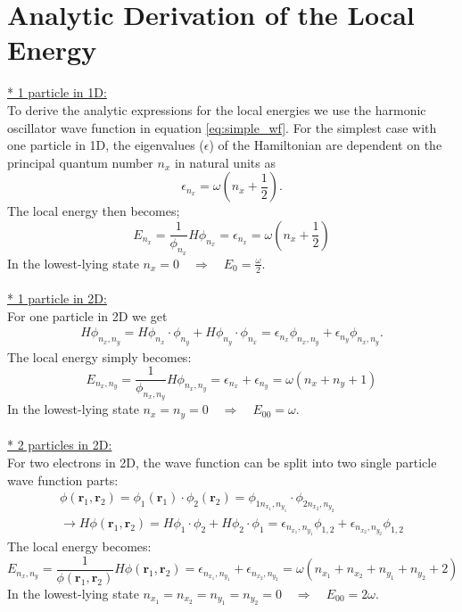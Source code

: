 \documentclass[12pt,a4paper,english]{article}
\begin{document}
\section{Analytic Derivation of the Local Energy}
\label{appendix:Analytic_EL}
\underline{* 1 particle in 1D:}\\
To derive the analytic expressions for the local energies we use the harmonic oscillator wave function in equation \ref{eq:simple_wf}. For the simplest case with one particle in 1D, the eigenvalues ($\epsilon$) of the Hamiltonian are dependent on the principal quantum number $n_x$ in natural units as
\begin{equation*}
\epsilon_{n_x}=\omega(n_x+\frac{1}{2}).
\end{equation*}
The local energy then becomes;
\begin{equation*}
E_{n_x}=\frac{1}{\phi_{n_x}}H\phi_{n_x}=\epsilon_{n_x}=\omega(n_x+\frac{1}{2})
\end{equation*}
In the lowest-lying state $n_x=0 \quad \Rightarrow \quad E_0=\frac{\omega}{2}$.
\\ \\
\underline{* 1 particle in 2D:}\\
For one particle in 2D we get
\begin{align*}
H\phi_{n_x,n_y}=H\phi_{n_x}\cdot\phi_{n_y}+H\phi_{n_y}\cdot\phi_{n_x}= \epsilon_{n_x}\phi_{n_x,n_y}+\epsilon_{n_y}\phi_{n_x,n_y}.
\end{align*}
The local energy simply becomes:
\begin{equation*}
E_{n_x,n_y}=\frac{1}{\phi_{n_x,n_y}}H\phi_{n_x,n_y}=\epsilon_{n_x}+\epsilon_{n_y}=\omega(n_x+n_y+1)
\end{equation*}
In the lowest-lying state $n_x=n_y=0\quad \Rightarrow \quad E_{00}=\omega$.
\\ \\
\underline{* 2 particles in 2D:}\\
For two electrons in 2D, the wave function can be split into two single particle wave function parts:
\begin{align*}
\phi(\textbf{r}_1, \textbf{r}_2)=\phi_1(\textbf{r}_1)\cdot\phi_2(\textbf{r}_2)=\phi_{1 n_{x_1}, n_{y_1}}\cdot\phi_{2 n_{x_2}, n_{y_2}}\\
\rightarrow H\phi(\textbf{r}_1, \textbf{r}_2)=H\phi_1\cdot\phi_2+H\phi_2\cdot\phi_1=\epsilon_{n_{x_1},n_{y_1}}\phi_{1,2}+\epsilon_{n_{x_2},n_{y_2}}\phi_{1,2}
\end{align*}
The local energy becomes:
\begin{equation*}
E_{n_x,n_y}=\frac{1}{\phi(\textbf{r}_1, \textbf{r}_2)}H\phi(\textbf{r}_1, \textbf{r}_2)=\epsilon_{n_{x_1},n_{y_1}}+\epsilon_{n_{x_2},n_{y_2}}=\omega(n_{x_1}+n_{x_2}+n_{y_1}+ n_{y_2}+2)
\end{equation*}
In the lowest-lying state $n_{x_1}=n_{x_2}=n_{y_1}=n_{y_2}=0\quad \Rightarrow \quad E_{00}=2\omega$.\\
\end{document}
